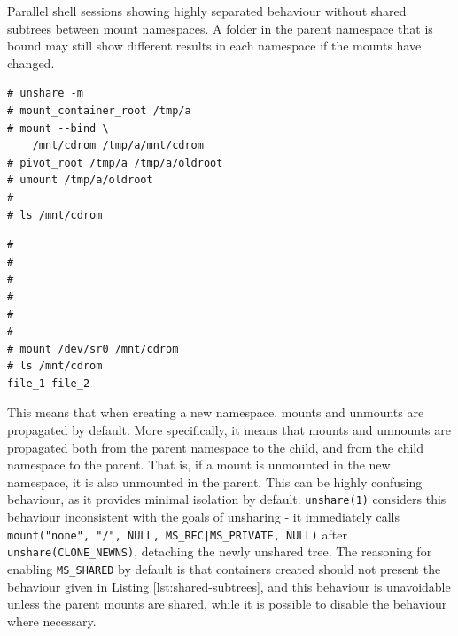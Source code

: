 \documentclass[12pt,a4paper,twoside]{report}
\begin{document}
\begin{listing}
\label{lst:shared-subtrees}
\caption{Parallel shell sessions showing highly separated behaviour without shared subtrees between mount namespaces. A folder in the parent namespace that is bound may still show different results in each namespace if the mounts have changed.}

\begin{minipage}{.49\textwidth}

\begin{verbatim}
# unshare -m
# mount_container_root /tmp/a
# mount --bind \
    /mnt/cdrom /tmp/a/mnt/cdrom
# pivot_root /tmp/a /tmp/a/oldroot
# umount /tmp/a/oldroot
#
# ls /mnt/cdrom

\end{verbatim}

\end{minipage}\hfill
\begin{minipage}{.49\textwidth}

\begin{verbatim}
#
#
#
#
#
#
# mount /dev/sr0 /mnt/cdrom
# ls /mnt/cdrom
file_1 file_2
\end{verbatim}

\end{minipage}
\end{listing}


This means that when creating a new namespace, mounts and unmounts are propagated by default. More specifically, it means that mounts and unmounts are propagated both from the parent namespace to the child, and from the child namespace to the parent. That is, if a mount is unmounted in the new namespace, it is also unmounted in the parent. This can be highly confusing behaviour, as it provides minimal isolation by default. \texttt{unshare(1)} considers this behaviour inconsistent with the goals of unsharing - it immediately calls \texttt{mount("none", "/", NULL, MS\_REC|MS\_PRIVATE, NULL)} after \texttt{unshare(CLONE\_NEWNS)}, detaching the newly unshared tree. The reasoning for enabling \texttt{MS\_SHARED} by default is that containers created should not present the behaviour given in Listing \ref{lst:shared-subtrees}, and this behaviour is unavoidable unless the parent mounts are shared, while it is possible to disable the behaviour where necessary.
\end{document}
